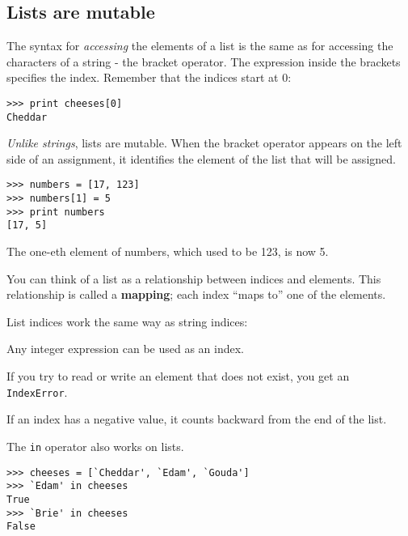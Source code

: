 \documentclass{article}
\begin{document}
\subsection{Lists are mutable}
The syntax for \emph{accessing} the elements of a list is the same as for
accessing the characters of a string - the bracket operator. The
expression inside the brackets specifies the index. Remember that the
indices start at 0:
\begin{verbatim}
>>> print cheeses[0]
Cheddar
\end{verbatim}
\par \emph{Unlike strings}, lists are mutable. When the bracket operator appears
on the left side of an assignment, it identifies the element of the
list that will be assigned.
\begin{verbatim}
>>> numbers = [17, 123]
>>> numbers[1] = 5
>>> print numbers
[17, 5]
\end{verbatim}
\par The one-eth element of numbers, which used to be 123, is now 5.
\par You can think of a list as a relationship between indices and
elements. This relationship is called a \textbf{mapping}; each index
``maps to'' one of the elements.
\par List indices work the same way as string indices:
\begin{itemize*}
\item Any integer expression can be used as an index.
\item If you try to read or write an element that does not exist,
        you get an \verb|IndexError|.
\item If an index has a negative value, it counts backward from
    the end of the list.
\end{itemize*}
The \verb|in| operator also works on lists.
\begin{verbatim}
>>> cheeses = [`Cheddar', `Edam', `Gouda']
>>> `Edam' in cheeses
True
>>> `Brie' in cheeses
False
\end{verbatim}
\end{document}
